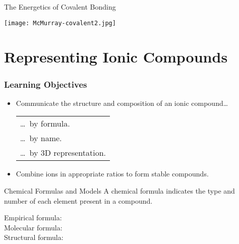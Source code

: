 \documentclass[handout]{beamer}
\begin{document}
\begin{frame}{The Energetics of Covalent Bonding}
	\begin{center}
		\texttt{[image: McMurray-covalent2.jpg]}
	\end{center}
\end{frame}

\section{Representing Ionic Compounds}

\begin{frame}
	\frametitle{Learning Objectives}
	\begin{itemize}
	\item Communicate the structure and composition of an ionic
		compound\ldots

		\begin{tabular} {>{\ldots~}l}
			by formula.           \\
			by name.              \\
			by 3D representation.
		\end{tabular}
	\item Combine ions in appropriate ratios to form stable compounds.
	\end{itemize}
\end{frame}

\begin{frame}[t]{Chemical Formulas and Models}
	A chemical formula indicates the type and number of each element present
	in a compound.
	\begin{description}
		\item[Empirical formula:] \null {}

		\vfill

		\null

	\item[Molecular formula:] \null {}

		\vfill
		\null
	\item[Structural formula:] \null {}

		\vfill

		\null
	\end{description}
\end{frame}
\end{document}
